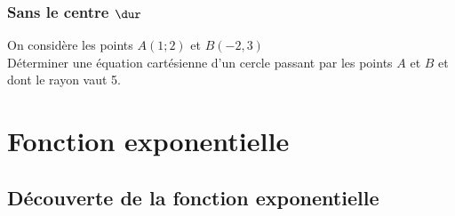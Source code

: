 \documentclass[oneside,12pt]{book}          %
\begin{document}
\subsection{Sans le centre $\dur$}

On considère les points $A(1;2)$ et $B(-2,3)$ \\
Déterminer une équation cartésienne d'un cercle passant par les points $A$ et $B$ et dont le rayon vaut 5.



\chapter{Fonction exponentielle}
\newpage

\section{Découverte de la fonction exponentielle}
\end{document}
